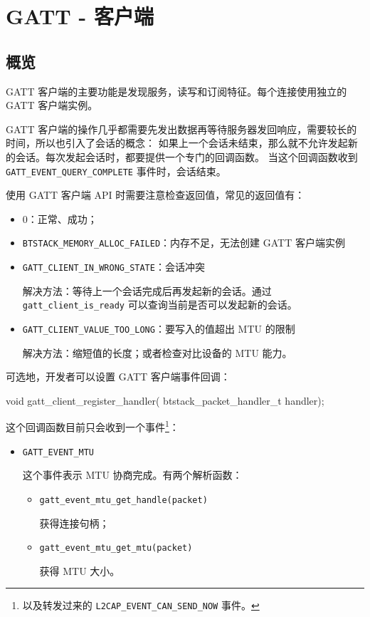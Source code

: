 \documentclass[
  12pt,
]{book}
\newenvironment{Shaded}{\begin{snugshade}}{\end{snugshade}}
\newcommand{\DataTypeTok}[1]{\textcolor[rgb]{0.13,0.29,0.53}{#1}}
\newcommand{\NormalTok}[1]{#1}
\begin{document}
\hypertarget{ch-gatt-client}{%
\chapter{GATT - 客户端}\label{ch-gatt-client}}

\hypertarget{ux6982ux89c8-4}{%
\section{概览}\label{ux6982ux89c8-4}}

GATT 客户端的主要功能是发现服务，读写和订阅特征。每个连接使用独立的 GATT 客户端实例。

GATT 客户端的操作几乎都需要先发出数据再等待服务器发回响应，需要较长的时间，所以也引入了会话的概念：
如果上一个会话未结束，那么就不允许发起新的会话。每次发起会话时，都要提供一个专门的回调函数。
当这个回调函数收到 \texttt{GATT\_EVENT\_QUERY\_COMPLETE} 事件时，会话结束。

使用 GATT 客户端 API 时需要注意检查返回值，常见的返回值有：

\begin{itemize}
\item
  \(0\)：正常、成功；
\item
  \texttt{BTSTACK\_MEMORY\_ALLOC\_FAILED}：内存不足，无法创建 GATT 客户端实例
\item
  \texttt{GATT\_CLIENT\_IN\_WRONG\_STATE}：会话冲突

  解决方法：等待上一个会话完成后再发起新的会话。通过 \texttt{gatt\_client\_is\_ready} 可以查询当前是否可以发起新的会话。
\item
  \texttt{GATT\_CLIENT\_VALUE\_TOO\_LONG}：要写入的值超出 MTU 的限制

  解决方法：缩短值的长度；或者检查对比设备的 MTU 能力。
\end{itemize}

可选地，开发者可以设置 GATT 客户端事件回调：

\begin{Shaded}
\begin{Highlighting}[]
\DataTypeTok{void}\NormalTok{ gatt_client_register_handler(}
\NormalTok{  btstack_packet_handler_t handler);}
\end{Highlighting}
\end{Shaded}

这个回调函数目前只会收到一个事件\footnote{以及转发过来的 \texttt{L2CAP\_EVENT\_CAN\_SEND\_NOW} 事件。}：

\begin{itemize}
\item
  \texttt{GATT\_EVENT\_MTU}

  这个事件表示 MTU 协商完成。有两个解析函数：

  \begin{itemize}
  \item
    \texttt{gatt\_event\_mtu\_get\_handle(packet)}

    获得连接句柄；
  \item
    \texttt{gatt\_event\_mtu\_get\_mtu(packet)}

    获得 MTU 大小。
  \end{itemize}
\end{itemize}
\end{document}

